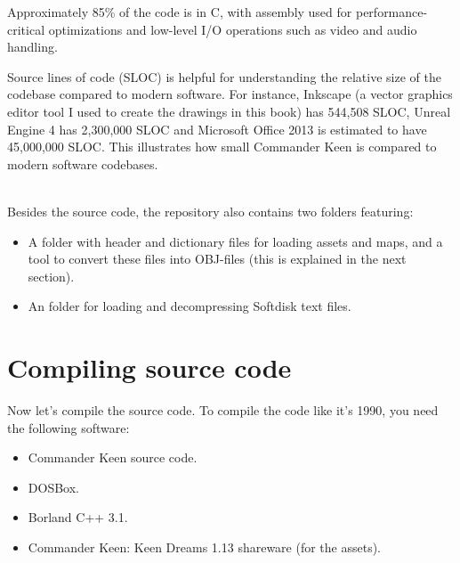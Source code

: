 \documentclass[book.tex]{subfiles}
\begin{document}
\par
\begin{minipage}{\textwidth}

\end{minipage}

\vspace{8pt}
\par
Approximately 85\% of the code is in C, with assembly used for performance-critical optimizations and low-level I/O operations such as video and audio handling. \\

\par
Source lines of code (SLOC) is helpful for understanding the relative size of the codebase compared to modern software. For instance, Inkscape (a vector graphics editor tool I used to create the drawings in this book) has 544,508 SLOC, Unreal Engine 4 has 2,300,000 SLOC and Microsoft Office 2013 is estimated to have 45,000,000 SLOC. This illustrates how small Commander Keen is compared to modern software codebases.\\

\\

 
\par 
Besides the source code, the repository also contains two folders featuring:
\begin{itemize}
\item A  folder with header and dictionary files for loading assets and maps, and a tool  to convert these files into OBJ-files (this is explained in the next section).
\item An  folder for loading and decompressing Softdisk text files.
\end{itemize}

\section{Compiling source code}
Now let's compile the source code. To compile the code like it's 1990, you need the following software:
\begin{itemize}
\item Commander Keen source code.
\item DOSBox.
\item Borland C++ 3.1.
\item Commander Keen: Keen Dreams 1.13 shareware (for the assets).
\end{itemize}
\end{document}
